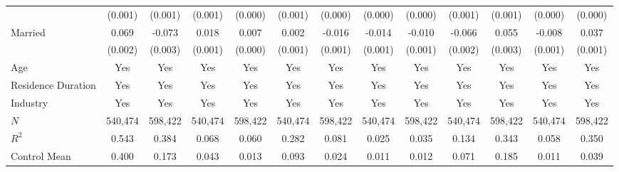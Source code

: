 \documentclass[serif, aspectratio=169]{beamer}
\begin{document}
\begin{frame}
\begin{table}[htbp]
\begin{tabular}{@{}l*{12}{c}@{}}
          &  (0.001)         &  (0.001)         &  (0.001)         &  (0.000)         &  (0.001)         &  (0.000)         &  (0.000)         &  (0.000)         &  (0.001)         &  (0.001)         &  (0.000)         &  (0.000)         \\
\addlinespace
Married   &    0.069\sym{***}&   -0.073\sym{***}&    0.018\sym{***}&    0.007\sym{***}&    0.002\sym{*}  &   -0.016\sym{***}&   -0.014\sym{***}&   -0.010\sym{***}&   -0.066\sym{***}&    0.055\sym{***}&   -0.008\sym{***}&    0.037\sym{***}\\
          &  (0.002)         &  (0.003)         &  (0.001)         &  (0.000)         &  (0.001)         &  (0.001)         &  (0.001)         &  (0.001)         &  (0.002)         &  (0.003)         &  (0.001)         &  (0.001)         \\
\addlinespace
Age &      Yes         &      Yes         &      Yes         &      Yes         &      Yes         &      Yes         &      Yes         &      Yes         &      Yes         &      Yes         &      Yes         &      Yes         \\
\addlinespace
Residence Duration &      Yes         &      Yes         &      Yes         &      Yes         &      Yes         &      Yes         &      Yes         &      Yes         &      Yes         &      Yes         &      Yes         &      Yes         \\
\addlinespace
Industry  &      Yes         &      Yes         &      Yes         &      Yes         &      Yes         &      Yes         &      Yes         &      Yes         &      Yes         &      Yes         &      Yes         &      Yes         \\
\midrule
$\textit{N}$&  540,474         &  598,422         &  540,474         &  598,422         &  540,474         &  598,422         &  540,474         &  598,422         &  540,474         &  598,422         &  540,474         &  598,422         \\
$\textit{R}^2$&    0.543         &    0.384         &    0.068         &    0.060         &    0.282         &    0.081         &    0.025         &    0.035         &    0.134         &    0.343         &    0.058         &    0.350         \\
Control Mean&    0.400         &    0.173         &    0.043         &    0.013         &    0.093         &    0.024         &    0.011         &    0.012         &    0.071         &    0.185         &    0.011         &    0.039         \\
\bottomrule
\end{tabular}
\\\\
\\

\end{table}


\end{frame}
\end{document}
